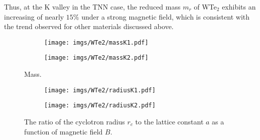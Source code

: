\documentclass{article}
\begin{document}
Thus, at the K valley in the TNN case, the reduced mass $m_r$ of WTe$_{2}$ exhibits an increasing of nearly $15\%$ under a strong magnetic field, which is consistent with the trend observed for other materials discussed above.

\begin{figure}[htb]
	\begin{subfigure}{0.495\textwidth}
		\centering
		\texttt{[image: imgs/WTe2/massK1.pdf]}
	\end{subfigure}
	\begin{subfigure}{0.495\textwidth}
		\centering
		\texttt{[image: imgs/WTe2/massK2.pdf]}
	\end{subfigure}
	\caption{Mass.}
\end{figure}
\begin{figure}[!h]
	\begin{subfigure}{0.495\textwidth}
		\centering
		\texttt{[image: imgs/WTe2/radiusK1.pdf]}
	\end{subfigure}
	\begin{subfigure}{0.495\textwidth}
		\centering
		\texttt{[image: imgs/WTe2/radiusK2.pdf]}
	\end{subfigure}
	\caption{The ratio of the cyclotron radius $r_{c}$ to the lattice constant $a$ as a function of magnetic field $B$.}
\end{figure}

\newpage



\end{document}
